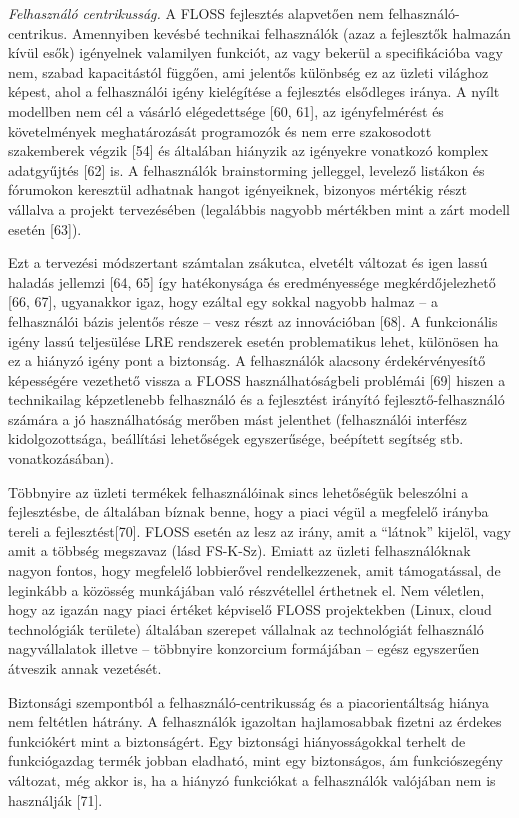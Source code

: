 \documentclass[12pt,magyar,a4paper,oneside]{scrreprt}
\begin{document}
\emph{Felhasználó centrikusság.} A FLOSS fejlesztés alapvetően nem
felhasználó-centrikus. Amennyiben kevésbé technikai felhasználók (azaz a
fejlesztők halmazán kívül esők) igényelnek valamilyen funkciót, az vagy
bekerül a specifikációba vagy nem, szabad kapacitástól függően, ami
jelentős különbség ez az üzleti világhoz képest, ahol a felhasználói
igény kielégítése a fejlesztés elsődleges iránya. A nyílt modellben nem
cél a vásárló elégedettsége {[}60, 61{]}, az igényfelmérést és
követelmények meghatározását programozók és nem erre szakosodott
szakemberek végzik {[}54{]} és általában hiányzik az igényekre vonatkozó
komplex adatgyűjtés {[}62{]} is. A felhasználók brainstorming jelleggel,
levelező listákon és fórumokon keresztül adhatnak hangot igényeiknek,
bizonyos mértékig részt vállalva a projekt tervezésében (legalábbis
nagyobb mértékben mint a zárt modell esetén {[}63{]}).

Ezt a tervezési módszertant számtalan zsákutca, elvetélt változat és
igen lassú haladás jellemzi {[}64, 65{]} így hatékonysága és
eredményessége megkérdőjelezhető {[}66, 67{]}, ugyanakkor igaz, hogy
ezáltal egy sokkal nagyobb halmaz -- a felhasználói bázis jelentős része
-- vesz részt az innovációban {[}68{]}. A funkcionális igény lassú
teljesülése LRE rendszerek esetén problematikus lehet, különösen ha ez a
hiányzó igény pont a biztonság. A felhasználók alacsony érdekérvényesítő
képességére vezethető vissza a FLOSS használhatóságbeli problémái
{[}69{]} hiszen a technikailag képzetlenebb felhasználó és a fejlesztést
irányító fejlesztő-felhasználó számára a jó használhatóság merőben mást
jelenthet (felhasználói interfész kidolgozottsága, beállítási
lehetőségek egyszerűsége, beépített segítség stb. vonatkozásában).

Többnyire az üzleti termékek felhasználóinak sincs lehetőségük
beleszólni a fejlesztésbe, de általában bíznak benne, hogy a piaci végül
a megfelelő irányba tereli a fejlesztést{[}70{]}. FLOSS esetén az lesz
az irány, amit a ``látnok'' kijelöl, vagy amit a többség megszavaz (lásd
FS-K-Sz). Emiatt az üzleti felhasználóknak nagyon fontos, hogy megfelelő
lobbierővel rendelkezzenek, amit támogatással, de leginkább a közösség
munkájában való részvétellel érthetnek el. Nem véletlen, hogy az igazán
nagy piaci értéket képviselő FLOSS projektekben (Linux, cloud
technológiák területe) általában szerepet vállalnak az technológiát
felhasználó nagyvállalatok illetve -- többnyire konzorcium formájában --
egész egyszerűen átveszik annak vezetését.

Biztonsági szempontból a felhasználó-centrikusság és a piacorientáltság
hiánya nem feltétlen hátrány. A felhasználók igazoltan hajlamosabbak
fizetni az érdekes funkciókért mint a biztonságért. Egy biztonsági
hiányosságokkal terhelt de funkciógazdag termék jobban eladható, mint
egy biztonságos, ám funkciószegény változat, még akkor is, ha a hiányzó
funkciókat a felhasználók valójában nem is használják {[}71{]}.
\end{document}
